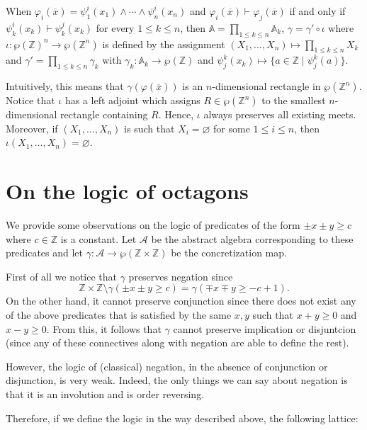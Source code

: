 \documentclass[11pt]{article}
\theoremstyle{plain}
\theoremstyle{definition}
\begin{document}
When $\varphi_i(\overline{x})=\psi^i_1(x_1)\land\cdots\land\psi^i_n(x_n)$ and $\varphi_i(\overline{x})\vdash\varphi_j(\overline{x})$ if and only if $\psi^i_k(x_k)\vdash\psi^j_k(x_k)$ for every $1\leq k\leq n$, then $\mathbb{A}=\prod_{1\leq k\leq n}\mathbb{A}_k$, $\gamma=\gamma'\circ\iota$ where $\iota:\wp(\mathbb{Z})^n\to \wp(\mathbb{Z}^n)$ is defined by the assignment $(X_1,\ldots,X_n)\mapsto\prod_{1\leq k\leq n}X_k$ and $\gamma'=\prod_{1\leq k\leq n}\gamma_k$ with $\gamma_k:\mathbb{A}_k\to\wp(\mathbb{Z})$ and $\psi^k_j(x_k)\mapsto\{a\in\mathbb{Z}\mid \psi^k_j(a)\}$.

Intuitively, this means that $\gamma(\varphi(\overline{x}))$ is an $n$-dimensional rectangle in $\wp(\mathbb{Z}^n)$. Notice that $\iota$ has a left adjoint which assigns $R\in\wp( \mathbb{Z}^n)$ to the smallest $n$-dimensional rectangle containing $R$. Hence, $\iota$ always preserves all existing meets. Moreover, if $(X_1,\ldots,X_n)$ is such that $X_i=\varnothing$ for some $1\leq i\leq n$, then $\iota(X_1,\ldots,X_n)=\varnothing$.    







\section{On the logic of octagons}


We provide some observations on the logic of predicates of the form $\pm x\pm y\geq c$ where $c\in\mathbb{Z}$ is a constant. Let $\mathcal{A}$ be the abstract algebra corresponding to these predicates and let $\gamma:\mathcal{A}\to\wp(\mathbb{Z}\times\mathbb{Z})$ be the concretization map. 

First of all we notice that  $\gamma$ preserves negation since $$\mathbb{Z}\times\mathbb{Z}\setminus\gamma(\pm x\pm y\geq c)=\gamma(\mp x\mp y\geq -c+1).$$ On the other hand, it cannot preserve conjunction since there does not exist any  of the above predicates that is satisfied by the same $x,y$ such that $x+y\geq 0$ and $x-y\geq 0$. From this, it follows that $\gamma$ cannot preserve implication or disjuntcion (since any of these connectives along with negation are able to define the rest). 

However, the logic of (classical) negation, in the absence of conjunction or disjunction, is very weak. Indeed, the only things we can say about negation is that it is an involution and is order reversing.

Therefore, if we define the logic in the way  described above, the following lattice:
\end{document}
